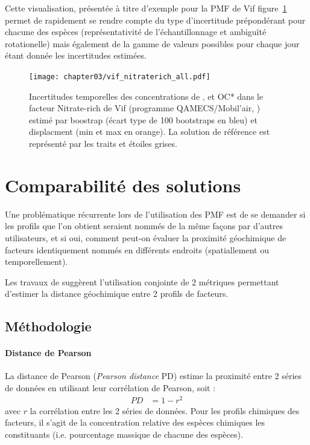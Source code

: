Cette visualisation, présentée à titre d'exemple pour la PMF de Vif
figure~\ref{fig:chapter03/vif_nitraterich_all} permet de rapidement se rendre compte du
type d'incertitude prépondérant pour chacune des espèces (représentativité de
l'échantillonnage et ambiguïté rotationelle) mais également de la gamme de valeurs
possibles pour chaque jour étant donnée les incertitudes estimées.

\begin{figure}[ht]
    \centering
    \texttt{[image: chapter03/vif\_nitraterich\_all.pdf]}
    \caption{Incertitudes temporelles des concentrations de \PMdix, \NOt et OC* dans le
        facteur Nitrate-rich de Vif (programme QAMECS/Mobil'air,
        \cite{borlazaFinescaleinprep.}) estimé par boostrap (écart type de 100 bootstraps en bleu)
        et displacment (min et max en orange). La solution de référence est représenté par les
    traits et étoiles grises.}%
    \label{fig:chapter03/vif_nitraterich_all}
\end{figure}


\section{Comparabilité des solutions}%
\label{sub:comparabilité_des_solutions}

Une problématique récurrente lors de l'utilisation des PMF est de se demander si les
profils que l'on obtient seraient nommés de la même façons par d'autres utilisateurs, et
si oui, comment peut-on évaluer la proximité géochimique de facteurs identiquement nommés
en différents endroits (spatiallement ou temporellement).

Les travaux de \cite{belisNew2015a} suggèrent l'utilisation conjointe de 2
métriques permettant d'estimer la distance géochimique entre 2 profils de facteurs.

\subsection{Méthodologie}%
\label{sub:méthodologie}

\paragraph{Distance de Pearson}%
\label{par:distance_de_pearson}

La distance de Pearson (\textit{Pearson distance} PD) estime la proximité entre 2 séries
de données en utilisant leur corrélation de Pearson, soit :
\begin{align}
    \label{eq:PD}
    PD &= 1 - r^2
\end{align}
avec $r$ la corrélation entre les 2 séries de données. Pour les profils chimiques des
facteurs, il s'agit de la concentration relative des espèces chimiques les constituants
(i.e. pourcentage massique de chacune des espèces).

